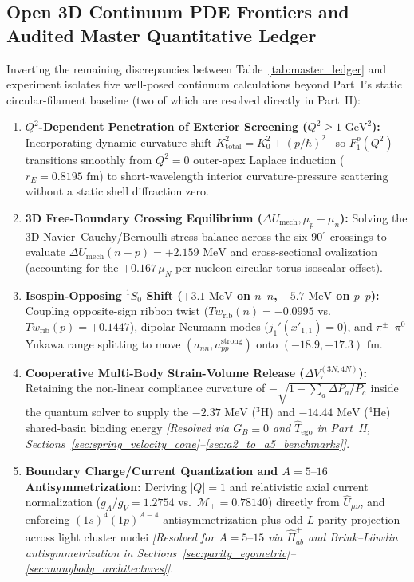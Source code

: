 \documentclass[11pt, a4paper]{article}
\begin{document}
\subsection{Open 3D Continuum PDE Frontiers and Audited Master Quantitative Ledger}
\label{sec:scope_ledger}
Inverting the remaining discrepancies between Table~\ref{tab:master_ledger} and experiment isolates five well-posed continuum calculations beyond Part~I's static circular-filament baseline (two of which are resolved directly in Part~II):
\begin{enumerate}[leftmargin=1.8em, itemsep=2pt]
    \item \textbf{$Q^2$-Dependent Penetration of Exterior Screening ($Q^2 \ge 1\text{ GeV}^2$):} Incorporating dynamic curvature shift $K_{\mathrm{total}}^2 = K_0^2 + (p/\hbar)^2$~\cite{bairmosheh2026} so $F_1^p(Q^2)$ transitions smoothly from $Q^2 = 0$ outer-apex Laplace induction ($r_E = 0.8195\text{ fm}$) to short-wavelength interior curvature-pressure scattering without a static shell diffraction zero.
    \item \textbf{3D Free-Boundary Crossing Equilibrium ($\Delta U_{\mathrm{mech}}, \mu_p + \mu_n$):} Solving the 3D Navier--Cauchy/Bernoulli stress balance across the six $90^\circ$ crossings to evaluate $\Delta U_{\mathrm{mech}}(n - p) = +2.159\text{ MeV}$ and cross-sectional ovalization (accounting for the $+0.167\,\mu_N$ per-nucleon circular-torus isoscalar offset).
    \item \textbf{Isospin-Opposing $^1S_0$ Shift ($+3.1\text{ MeV}$ on $n\text{--}n$, $+5.7\text{ MeV}$ on $p\text{--}p$):} Coupling opposite-sign ribbon twist ($Tw_{\mathrm{rib}}(n) = -0.0995$ vs.\ $Tw_{\mathrm{rib}}(p) = +0.1447$), dipolar Neumann modes ($j_1'(x'_{1,1}) = 0$), and $\pi^\pm\text{--}\pi^0$ Yukawa range splitting to move $(a_{nn}, a_{pp}^{\mathrm{strong}})$ onto $(-18.9, -17.3)\text{ fm}$.
    \item \textbf{Cooperative Multi-Body Strain-Volume Release ($\Delta V_\tau^{(3N,4N)}$):} Retaining the non-linear compliance curvature of $-\sqrt{1 - \sum_a \Delta P_a/P_c}$ inside the quantum solver to supply the $-2.37\text{ MeV}$ ($^3\text{H}$) and $-14.44\text{ MeV}$ ($^4\text{He}$) shared-basin binding energy \textit{[Resolved via $G_B \equiv 0$ and $\hat{T}_{\mathrm{ego}}$ in Part~II, Sections~\ref{sec:spring_velocity_cone}--\ref{sec:a2_to_a5_benchmarks}]}.
    \item \textbf{Boundary Charge/Current Quantization and $A = 5\text{--}16$ Antisymmetrization:} Deriving $|Q| = 1$ and relativistic axial current normalization ($g_A/g_V = 1.2754$ vs.\ $\mathcal{M}_\perp = 0.78140$) directly from $\hat{U}_{\mu\nu}$, and enforcing $(1s)^4(1p)^{A-4}$ antisymmetrization plus odd-$L$ parity projection across light cluster nuclei \textit{[Resolved for $A = 5\text{--}15$ via $\hat{\Pi}_{ab}^+$ and Brink--L\"{o}wdin antisymmetrization in Sections~\ref{sec:parity_egometric}--\ref{sec:manybody_architectures}]}.
\end{enumerate}
\end{document}
